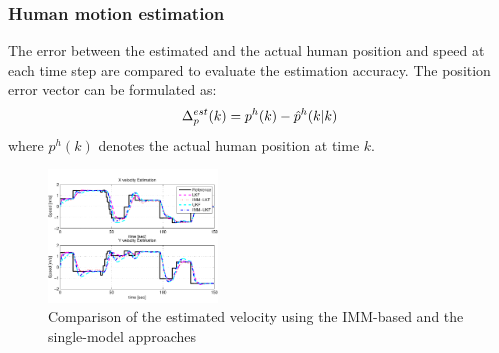 \documentclass[letterpaper, 10 pt, conference]{ieeeconf}
\begin{document}
	\subsubsection{Human motion estimation}\label{subsubsec:motion_est}
	The error between the estimated and the actual human position and speed at each time step are compared to evaluate the estimation accuracy.
	The position error vector can be formulated as:
	\small	\[
	\Delta^{est}_p(k)=p^h(k)-\hat{p}^h(k|k)\label{eqn:track_err_pos}\\
	\] \normalsize
	where $p^h(k)$ denotes the actual human position at time $k$. 
	
	
	
	
	
	
	
	\begin{figure}
		\centering
		\includegraphics[width=0.4\textwidth]{figures/VelocityComp}
		\caption{Comparison of the estimated velocity using the IMM-based and the single-model approaches}
		\label{fig:track_v}
	\end{figure}
	
\end{document}
